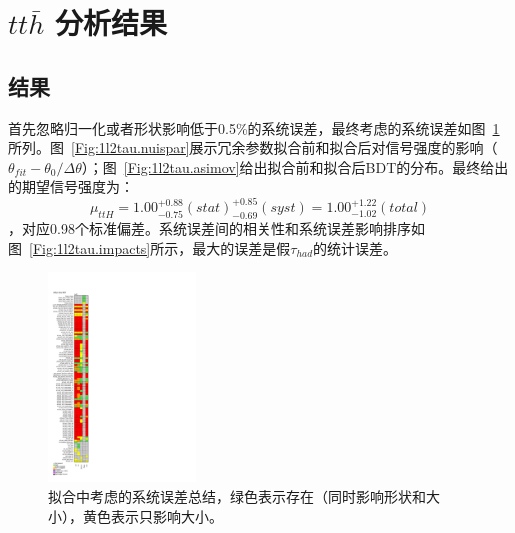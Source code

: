 \section{$tt\bar{h}$ 分析结果}\label{sec:ttH_results}

\subsection{\ltwotau 结果}
首先忽略归一化或者形状影响低于0.5\%的系统误差，最终考虑的系统误差如图~\ref{Fig:1l2tau.pruning}所列。图~\ref{Fig:1l2tau.nuispar}展示冗余参数拟合前和拟合后对信号强度的影响（$\theta_{fit}-\theta_{0}/\Delta\theta$）；图~\ref{Fig:1l2tau.asimov}给出拟合前和拟合后BDT的分布。最终给出的期望信号强度为：$$\mu_{ttH}=1.00^{+0.88}_{-0.75}(stat)^{+0.85}_{-0.69}(syst)=1.00^{+1.22}_{-1.02}(total)$$，对应0.98个标准偏差。系统误差间的相关性和系统误差影响排序如图~\ref{Fig:1l2tau.impacts}所示，最大的误差是假$\tau_{had}$的统计误差。

\begin{figure}[htbp]
\centering
\begin{center}
\includegraphics[width=0.35\textwidth, height=0.8\textheight]{fig/OneLepTwoTaus/Pruning.pdf}
\end{center}
\caption{\ltwotau 拟合中考虑的系统误差总结，绿色表示存在（同时影响形状和大小），黄色表示只影响大小。}
\label{Fig:1l2tau.pruning}
\end{figure}

